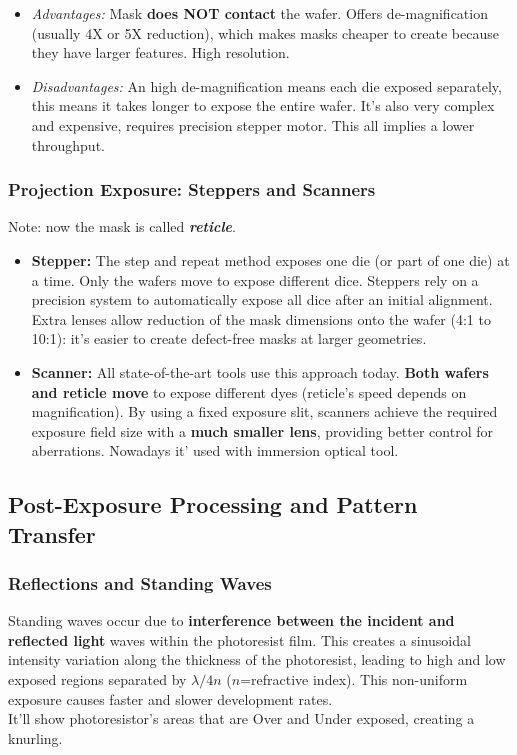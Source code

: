 \documentclass{report}
\begin{document}
\begin{itemize}
\begin{itemize}
        \item \textit{Advantages:} Mask \textbf{does NOT contact} the wafer. Offers de-magnification (usually 4X or 5X reduction), which makes masks cheaper to create because they have larger features. High resolution.
        \item \textit{Disadvantages:} An high de-magnification means each die exposed separately, this means it takes longer to expose the entire wafer. It's also very complex and expensive, requires precision stepper motor. 
        This all implies a lower throughput.
    \end{itemize} 
\end{itemize}
\subsubsection*{Projection Exposure: Steppers and Scanners} 
Note: now the mask is called \textit{\textbf{reticle}}.
\begin{itemize} 
    \item \textbf{Stepper:} The step and repeat method exposes one die (or part of one die) at a time. Only the wafers move to expose different dice. Steppers rely on a precision system to automatically expose all dice after an initial alignment. Extra lenses allow reduction of the mask dimensions onto the wafer (4:1 to 10:1): it's easier to create defect-free masks at larger geometries.
    \item \textbf{Scanner:} All state-of-the-art tools use this approach today. \textbf{Both wafers and reticle move} to expose different dyes (reticle's speed depends on magnification). By using a fixed exposure slit, scanners achieve the required exposure field size with a \textbf{much smaller lens}, providing better control for aberrations. 
    Nowadays it' used with immersion optical tool.
\end{itemize}

\subsection{Post-Exposure Processing and Pattern Transfer}
\subsubsection{Reflections and Standing Waves}
Standing waves occur due to \textbf{interference between the incident and reflected light} waves within the photoresist film. This creates a sinusoidal intensity variation along the thickness of the photoresist, leading to high and low exposed regions separated by $\lambda/4n$ ($n$=refractive index). This non-uniform exposure causes faster and slower development rates.
\\It'll show photoresistor's areas that are Over and Under exposed, creating a knurling.
\end{document}
